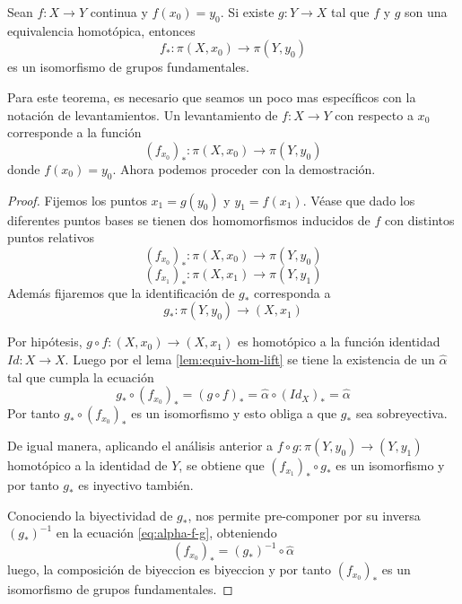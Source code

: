 \begin{teorema}
  Sean \(f : X \to Y\) continua y \(f (x_0) = y_0\). Si existe \(g : Y
  \to X\) tal que \(f\) y \(g\) son una equivalencia homotópica, entonces
  \[ f_* : \pi (X, x_0) \to \pi (Y, y_0)\]
  es un isomorfismo de grupos fundamentales.
\end{teorema}
\noindent Para este teorema, es necesario que seamos un poco mas
específicos con la notación de levantamientos. Un levantamiento de \(f :
X \to Y\) con respecto a \(x_0\) corresponde a la función
\[ (f_{x_0})_{*} : \pi (X , x_0) \to \pi (Y, y_0)\]
donde \(f(x_0) = y_0\). Ahora podemos proceder con la demostración.
\begin{proof}
  Fijemos los puntos \(x_1 = g(y_0)\) y \(y_1 = f(x_1)\). Véase que dado
  los diferentes puntos bases se tienen dos homomorfismos inducidos de
  \(f\) con distintos puntos relativos
  \[(f_{x_0})_* : \pi (X, x_0) \to \pi (Y, y_0)\]
  \[(f_{x_1})_* : \pi (X, x_1) \to \pi (Y, y_1)\]
  Además fijaremos que la identificación de \(g_*\) corresponda a
  \[ g_* : \pi (Y, y_0) \to (X, x_1) \]

  Por hipótesis, \(g \circ f : (X, x_0) \to (X, x_1)\) es homotópico a
  la función identidad \(Id : X \to X\). Luego por el lema
  \ref{lem:equiv-hom-lift} se tiene la existencia de un \(\hat \alpha\)
  tal que cumpla la ecuación
  \begin{equation} \label{eq:alpha-f-g}
  g_* \circ (f_{x_0})_* = (g \circ f)_* = \hat \alpha \circ (Id_X)_*
    = \hat \alpha
  \end{equation}
  Por tanto \(g_* \circ (f_{x_0})_*\) es un isomorfismo y esto obliga a
  que \(g_*\) sea sobreyectiva.

  De igual manera, aplicando el análisis anterior a \(f \circ g : \pi
  (Y, y_0) \to (Y, y_1)\) homotópico a la identidad de \(Y\), se
  obtiene que \((f_{x_1})_* \circ g_*\) es un isomorfismo y por tanto
  \(g_*\) es inyectivo también.

  Conociendo la biyectividad de \(g_*\), nos permite pre-componer por su
  inversa \((g_*)^{-1}\) en la ecuación \eqref{eq:alpha-f-g}, obteniendo
  \[ (f_{x_0})_* = (g_*)^{-1} \circ \hat \alpha\]
  luego, la composición de biyeccion es biyeccion y por tanto
  \((f_{x_0})_*\) es un isomorfismo de grupos fundamentales.
\end{proof}

